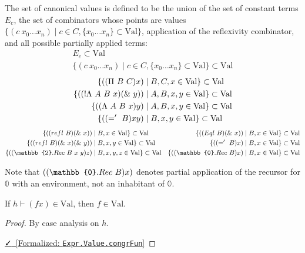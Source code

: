 \documentclass{lmcs}
\newcommand{\val}{\text{Val}}
\newcommand{\leanlink}[2]{
  \href{#1}{\textcolor{black}\faCheck~[Formalized: \texttt{#2}]}%
}
\begin{document}
\begin{defi}
  The set of canonical values is defined to be the union of the set of constant terms \(E_c\), the set of combinators whose points are values \(\{(c\ x_0 \ldots x_n) \mid c \in C, \{x_0 \ldots x_n\} \subset \val\}\), application of the reflexivity combinator, and all possible partially applied terms:
  \begin{gather*}
    E_c \subset \val\\
    \{(c\ x_0 \ldots x_n) \mid c \in C, \{x_0 \ldots x_n\} \subset \val\} \subset \val
  \end{gather*}
  \begin{align*}
    \{(\comb[\Pi][B][C] x) &\mid B, C, x \in \val\} \subset \val\\
    \{(\comb[!\Lambda][A][B][x] \comb[\&][y]) &\mid A, B, x, y \in \val\} \subset \val\\
    \{(\comb[\Lambda][A][B][x] y) &\mid A, B, x, y \in \val\} \subset \val\\
    \{(\comb[='][B] x y) &\mid B, x, y \in \val\} \subset \val
  \end{align*}
  \begin{align*}
    \{(\comb[refl][B] \comb[\&][x]) &\mid B, x \in \val\} \subset \val & \{(\comb[Eql][B] \comb[\&][x]) &\mid B, x \in \val\} \subset \val\\
    \{(\comb[refl][B] \comb[\&][x] \comb[\&][y]) &\mid B, x, y \in \val\} \subset \val & \{(\comb[='][B] x) &\mid B, x \in \val\} \subset \val\\
    \{(\comb[\mathbb{2}.Rec][B][x][y] z) &\mid B, x, y, z \in \val\} \subset \val & \{(\comb[\mathbb{0}.Rec][B] x) &\mid B, x \in \val\} \subset \val
  \end{align*}

  Note that \((\comb[\mathbb{0}.Rec][B] x)\) denotes partial application of the recursor for \(\mathbb{0}\) with an environment, not an inhabitant of \(\mathbb{0}\).
\end{defi}

\begin{lem}\label{lem:congrFunVal}
  If \(h \vdash (f x) \in \val\), then \(f \in \val\).
\end{lem}

\begin{proof}
  By case analysis on \(h\).

  \noindent \leanlink{https://github.com/lexzaiello/DCC/blob/fb7acf6d9644df7d13c809d12609b59eaca5c763/Dcc/Metatheory/Progress.lean\#L42}{Expr.Value.congrFun}
\end{proof}
\end{document}
